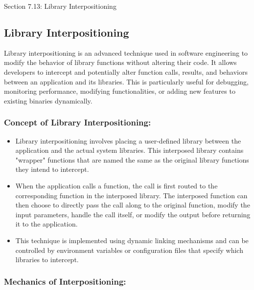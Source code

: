 \begin{notes}{Section 7.13: Library Interpositioning}
    \subsection*{Library Interpositioning}

    Library interpositioning is an advanced technique used in software engineering to modify the behavior of library functions without altering their code. It allows developers to intercept and 
    potentially alter function calls, results, and behaviors between an application and its libraries. This is particularly useful for debugging, monitoring performance, modifying functionalities, or 
    adding new features to existing binaries dynamically. \vspace*{1em}
    
    \subsubsection*{Concept of Library Interpositioning:}
    
    \begin{itemize}
        \item Library interpositioning involves placing a user-defined library between the application and the actual system libraries. This interposed library contains "wrapper" functions that are 
        named the same as the original library functions they intend to intercept.
        \item When the application calls a function, the call is first routed to the corresponding function in the interposed library. The interposed function can then choose to directly pass the call 
        along to the original function, modify the input parameters, handle the call itself, or modify the output before returning it to the application.
        \item This technique is implemented using dynamic linking mechanisms and can be controlled by environment variables or configuration files that specify which libraries to intercept.
    \end{itemize}
    
    \subsubsection*{Mechanics of Interpositioning:}
    

\end{notes}
